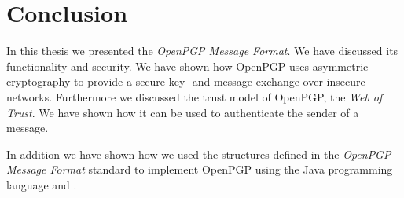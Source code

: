 \chapter{Conclusion} \label{chapter:conclusion}

In this thesis we presented the \textit{OpenPGP Message Format}. We have discussed its functionality and security. We have shown how OpenPGP uses asymmetric cryptography to provide a secure key- and message-exchange over insecure networks. Furthermore we discussed the trust model of OpenPGP, the \textit{Web of Trust}. We have shown how it can be used to authenticate the sender of a message.

In addition we have shown how we used the structures defined in the \textit{OpenPGP Message Format} standard to implement OpenPGP using the Java programming language and .